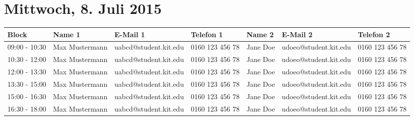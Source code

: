 \documentclass[a4paper, landscape, 12pt]{scrartcl}
\begin{document}
    \section*{Mittwoch, 8. Juli 2015}
    \begin{table}[h]
        \begin{tabular}{l|lll|lll}
        \toprule
        \textbf{Block} & \textbf{Name 1}  & \textbf{E-Mail 1}  & \textbf{Telefon 1}     & \textbf{Name 2} & \textbf{E-Mail 2} & \textbf{Telefon 2}     \\
        \midrule
         09:00 - 10:30 & Max Mustermann      & uabcd@student.kit.edu                  & 0160 123 456 78 & Jane Doe        & udoeo@student.kit.edu                 & 0160 123 456 78  \\
        10:30 - 12:00  & Max Mustermann      & uabcd@student.kit.edu                  & 0160 123 456 78 & Jane Doe        & udoeo@student.kit.edu                 & 0160 123 456 78  \\
        12:00 - 13:30  & Max Mustermann      & uabcd@student.kit.edu                  & 0160 123 456 78 & Jane Doe        & udoeo@student.kit.edu                 & 0160 123 456 78  \\
        13:30 - 15:00  & Max Mustermann      & uabcd@student.kit.edu                  & 0160 123 456 78 & Jane Doe        & udoeo@student.kit.edu                 & 0160 123 456 78  \\
        15:00 - 16:30  & Max Mustermann      & uabcd@student.kit.edu                  & 0160 123 456 78 & Jane Doe        & udoeo@student.kit.edu                 & 0160 123 456 78  \\
        16:30 - 18:00  & Max Mustermann      & uabcd@student.kit.edu                  & 0160 123 456 78 & Jane Doe        & udoeo@student.kit.edu                 & 0160 123 456 78  \\
        \bottomrule
        \end{tabular}
    \end{table}
\end{document}
